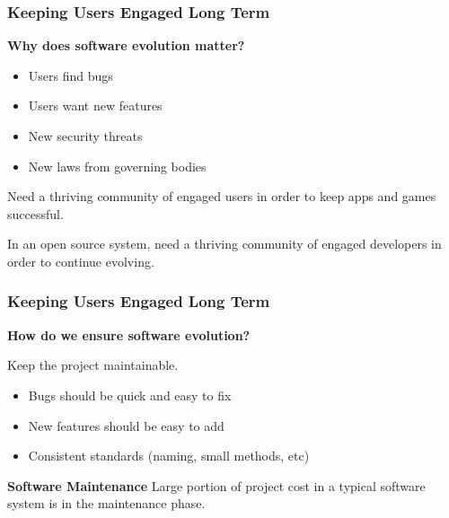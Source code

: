 \documentclass{beamer}
\begin{document}

\begin{frame}
  \frametitle{Keeping Users Engaged Long Term}
  \textbf{Why does software evolution matter?}
  \begin{itemize}
    \item Users find bugs
    \item Users want new features
    \item New security threats
    \item New laws from governing bodies
  \end{itemize}
  
  \vspace{0.5cm}
  Need a thriving community of engaged users in order to keep apps and games successful.

  \vspace{0.35cm}
  In an open source system, need a thriving community of engaged developers in order to continue evolving.
\end{frame}



\begin{frame}
  \frametitle{Keeping Users Engaged Long Term}
  \textbf{How do we ensure software evolution?}

  \vspace{0.35cm}
  Keep the project maintainable.
  \begin{itemize}
    \item Bugs should be quick and easy to fix
    \item New features should be easy to add
    \item Consistent standards (naming, small methods, etc)
  \end{itemize}

  \vspace{0.5cm}
  \textbf{Software Maintenance}
  \newline Large portion of project cost in a typical software system is in the maintenance phase.
\end{frame}
\end{document}
